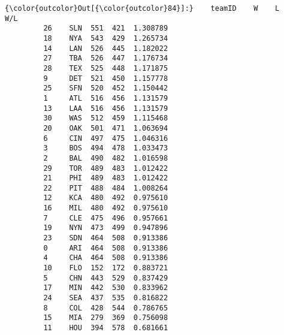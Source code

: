 \documentclass[11pt]{article}
\begin{document}
\begin{Verbatim}[commandchars=\\\{\}]
{\color{outcolor}Out[{\color{outcolor}84}]:}    teamID    W    L       W/L
         26    SLN  551  421  1.308789
         18    NYA  543  429  1.265734
         14    LAN  526  445  1.182022
         27    TBA  526  447  1.176734
         28    TEX  525  448  1.171875
         9     DET  521  450  1.157778
         25    SFN  520  452  1.150442
         1     ATL  516  456  1.131579
         13    LAA  516  456  1.131579
         30    WAS  512  459  1.115468
         20    OAK  501  471  1.063694
         6     CIN  497  475  1.046316
         3     BOS  494  478  1.033473
         2     BAL  490  482  1.016598
         29    TOR  489  483  1.012422
         21    PHI  489  483  1.012422
         22    PIT  488  484  1.008264
         12    KCA  480  492  0.975610
         16    MIL  480  492  0.975610
         7     CLE  475  496  0.957661
         19    NYN  473  499  0.947896
         23    SDN  464  508  0.913386
         0     ARI  464  508  0.913386
         4     CHA  464  508  0.913386
         10    FLO  152  172  0.883721
         5     CHN  443  529  0.837429
         17    MIN  442  530  0.833962
         24    SEA  437  535  0.816822
         8     COL  428  544  0.786765
         15    MIA  279  369  0.756098
         11    HOU  394  578  0.681661
\end{Verbatim}
            
\end{document}
